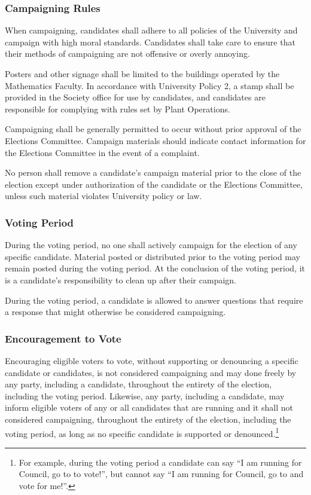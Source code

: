 \subsubsection{Campaigning Rules}
When campaigning, candidates shall adhere to all policies of the University and campaign with high moral standards.
Candidates shall take care to ensure that their methods of campaigning are not offensive or overly annoying.

Posters and other signage shall be limited to the buildings operated by the Mathematics Faculty.
In accordance with University Policy 2, a stamp shall be provided in the Society office for use by candidates, and candidates are responsible for complying with rules set by Plant Operations.

Campaigning shall be generally permitted to occur without prior approval of the Elections Committee.
Campaign materials should indicate contact information for the Elections Committee in the event of a complaint.

No person shall remove a candidate's campaign material prior to the close of the election except under authorization of the candidate or the Elections Committee, unless such material violates University policy or law.

\subsubsection{Voting Period}
During the voting period, no one shall actively campaign for the election of any specific candidate.
Material posted or distributed prior to the voting period may remain posted during the voting period.
At the conclusion of the voting period, it is a candidate's responsibility to clean up after their campaign.

During the voting period, a candidate is allowed to answer questions that require a response that might otherwise be considered campaigning.

\subsubsection{Encouragement to Vote}
Encouraging eligible voters to vote, without supporting or denouncing a specific candidate or candidates, is not considered campaigning and may done freely by any party, including a candidate, throughout the entirety of the election, including the voting period.
Likewise, any party, including a candidate, may inform eligible voters of any or all candidates that are running and it shall not considered campaigning, throughout the entirety of the election, including the voting period, as long as no specific candidate is supported or denounced.\footnote{For example, during the voting period a candidate can say ``I am running for Council, go to \votewebsite{} to vote!'', but cannot say ``I am running for Council, go to \votewebsite{} and vote for me!''.}

